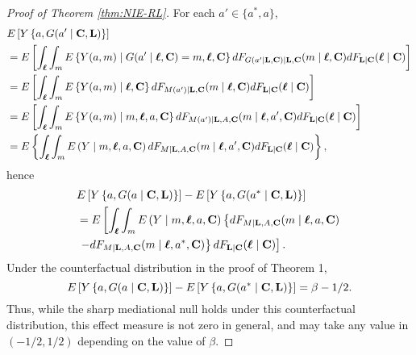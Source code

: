 \documentclass[12pt]{article}
\begin{document}
\begin{proof}[Proof of Theorem \ref{thm:NIE-RL}]
    For each $a'\in\{a^*,a\}$,
    \begin{align*}
        &E\left[Y\left\{a,G(a'\mid {\bf C}, {\bf L})\right\}\right]\\ 
        &= E\left[\int_{\boldsymbol\ell}\int_mE\left\{Y(a,m)\mid G(a'\mid {\boldsymbol\ell},{\bf C})=m,{\boldsymbol\ell},{\bf C}\right\}dF_{G(a'\mid {\bf L}, {\bf C})\mid {\bf L}, {\bf C}}(m\mid {\boldsymbol\ell}, {\bf C})dF_{\bf L\mid C}(\boldsymbol\ell\mid {\bf C})\right]\\
        &= E\left[\int_{\boldsymbol\ell}\int_mE\left\{Y(a,m)\mid {\boldsymbol\ell},{\bf C}\right\}dF_{M(a')\mid {\bf L}, {\bf C}}(m\mid {\boldsymbol\ell}, {\bf C})dF_{\bf L\mid C}(\boldsymbol\ell\mid {\bf C})\right]\\
        &= E\left[\int_{\boldsymbol\ell}\int_mE\left\{Y(a,m)\mid m,{\boldsymbol\ell},a,{\bf C}\right\}dF_{M(a')\mid {\bf L}, A, {\bf C}}(m\mid {\boldsymbol\ell}, a', {\bf C})dF_{\bf L\mid C}(\boldsymbol\ell\mid {\bf C})\right]\\
        &= E\left\{\int_{\boldsymbol\ell}\int_mE\left(Y\mid m,{\boldsymbol\ell},a,{\bf C}\right)dF_{M\mid {\bf L}, A, {\bf C}}(m\mid {\boldsymbol\ell}, a', {\bf C})dF_{\bf L\mid C}(\boldsymbol\ell\mid {\bf C})\right\},
    \end{align*}
    hence
    \begin{align*}
        &E\left[Y\left\{a,G(a\mid {\bf C}, {\bf L})\right\}\right]-E\left[Y\left\{a,G(a^*\mid {\bf C}, {\bf L})\right\}\right]\\
        &= E\left[\int_{\boldsymbol\ell}\int_mE\left(Y\mid m,{\boldsymbol\ell},a,{\bf C}\right)\left\{dF_{M\mid {\bf L}, A, {\bf C}}(m\mid {\boldsymbol\ell}, a, {\bf C})\right.\right.\\
        &\left.\left.-dF_{M\mid {\bf L}, A, {\bf C}}(m\mid {\boldsymbol\ell}, a^*, {\bf C})\right\}dF_{\bf L\mid C}(\boldsymbol\ell\mid {\bf C})\right].
    \end{align*}
    Under the counterfactual distribution in the proof of Theorem 1,
    \[E\left[Y\left\{a,G(a\mid {\bf C}, {\bf L})\right\}\right]-E\left[Y\left\{a,G(a^*\mid {\bf C}, {\bf L})\right\}\right] = \beta - 1/2.\]
    Thus, while the sharp mediational null holds under this counterfactual distribution, this effect measure is not zero in general, and may take any value in $(-1/2,1/2)$ depending on the value of $\beta$.
\end{proof}
\end{document}

